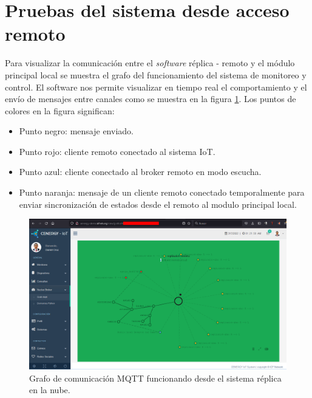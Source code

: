 \section{Pruebas del sistema desde acceso remoto}

Para visualizar la comunicación entre el \emph{software} réplica - remoto y el módulo principal local se muestra el grafo del funcionamiento del sistema de monitoreo y control. El software nos permite visualizar en tiempo real el comportamiento y el envío de mensajes entre canales como se muestra en la figura \ref{fig:graforemoto}. Los puntos de colores en la figura significan:

\begin{itemize}
\item Punto negro: mensaje enviado.
\item Punto rojo: cliente remoto conectado al sistema IoT.
\item Punto azul: cliente conectado al broker remoto en modo escucha.
\item Punto naranja: mensaje de un cliente remoto conectado temporalmente para enviar sincronización de estados desde el remoto al modulo principal local. 
\end{itemize}

\begin{landscape} %
\begin{figure}[htpb]
\centering 
\includegraphics[width=1.6\textwidth]{./Figures/test/replicador/remoto.png}
\caption{Grafo de comunicación MQTT funcionando desde el sistema réplica en la nube.}
\label{fig:graforemoto}
\end{figure}
\end{landscape} 


